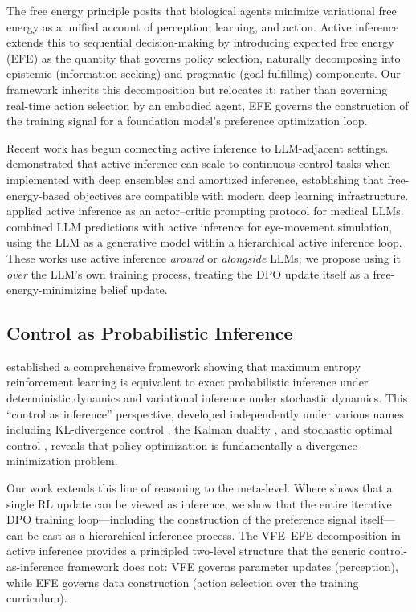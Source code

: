 \documentclass[11pt]{article}
\begin{document}
The free energy principle \citep{friston2006free,friston2010free} posits that biological agents minimize variational free energy as a unified account of perception, learning, and action. Active inference \citep{friston2015active,parr2022active} extends this to sequential decision-making by introducing expected free energy (EFE) as the quantity that governs policy selection, naturally decomposing into epistemic (information-seeking) and pragmatic (goal-fulfilling) components. Our framework inherits this decomposition but relocates it: rather than governing real-time action selection by an embodied agent, EFE governs the construction of the training signal for a foundation model's preference optimization loop.

Recent work has begun connecting active inference to LLM-adjacent settings. \citet{tschantz2020reinforcement} demonstrated that active inference can scale to continuous control tasks when implemented with deep ensembles and amortized inference, establishing that free-energy-based objectives are compatible with modern deep learning infrastructure. \citet{waters2025active} applied active inference as an actor--critic prompting protocol for medical LLMs. \citet{donnarumma2024integrating} combined LLM predictions with active inference for eye-movement simulation, using the LLM as a generative model within a hierarchical active inference loop. These works use active inference \emph{around} or \emph{alongside} LLMs; we propose using it \emph{over} the LLM's own training process, treating the DPO update itself as a free-energy-minimizing belief update.

\subsection{Control as Probabilistic Inference}

\citet{levine2018reinforcement} established a comprehensive framework showing that maximum entropy reinforcement learning is equivalent to exact probabilistic inference under deterministic dynamics and variational inference under stochastic dynamics. This ``control as inference'' perspective, developed independently under various names including KL-divergence control \citep{kappen2012optimal}, the Kalman duality \citep{todorov2008general}, and stochastic optimal control \citep{toussaint2009robot}, reveals that policy optimization is fundamentally a divergence-minimization problem.

Our work extends this line of reasoning to the meta-level. Where \citet{levine2018reinforcement} shows that a single RL update can be viewed as inference, we show that the entire iterative DPO training loop---including the construction of the preference signal itself---can be cast as a hierarchical inference process. The VFE--EFE decomposition in active inference provides a principled two-level structure that the generic control-as-inference framework does not: VFE governs parameter updates (perception), while EFE governs data construction (action selection over the training curriculum).
\end{document}
